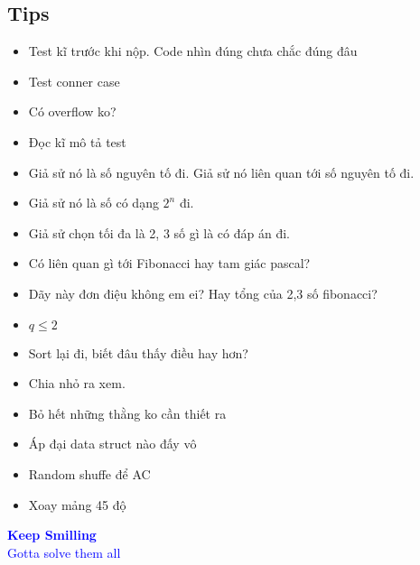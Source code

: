 \documentclass[A4 paper, 12pt, oneside]{article}
\begin{document}
\begin{landscape}
\begin{multicols}{2}
	\section{Tips}
	\begin{itemize}[topsep=0pt, partopsep=0pt, itemsep=0pt]
	\item Test kĩ trước khi nộp. Code nhìn đúng chưa chắc đúng đâu
	\item Test conner case
	\item Có overflow ko?
	\item Đọc kĩ mô tả test
	\item Giả sử nó là số nguyên tố đi. Giả sử nó liên quan tới số nguyên tố đi.\\
	\item Giả sử nó là số có dạng \(2^n\) đi.\\
	\item Giả sử chọn tối đa là 2, 3 số gì là có đáp án đi.\\
	\item Có liên quan gì tới Fibonacci hay tam giác pascal?\\
	\item Dãy này đơn điệu không em ei? Hay tổng của 2,3 số fibonacci?\\
	\item \(q \leq 2\)\\
	\item Sort lại đi, biết đâu thấy điều hay hơn?\\
	\item Chia nhỏ ra xem.\\
	\item Bỏ hết những thằng ko cần thiết ra\\
	\item Áp đại data struct nào đấy vô\\
	\item Random shuffe để AC\\
	\item Xoay mảng 45 độ\\
	\end{itemize}

	\end{multicols}

	\centering
	\Huge
	\textcolor{blue}{\textbf{Keep Smilling}} \\
	\textcolor{blue}{Gotta solve them all}
	\end{landscape}
\end{document}
